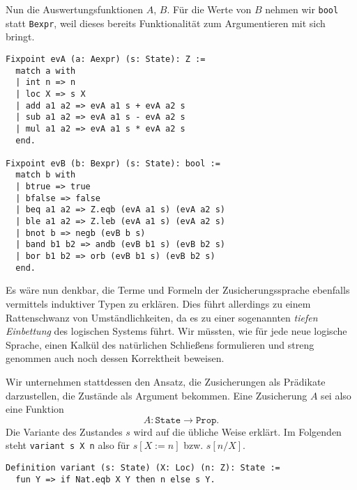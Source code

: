 \documentclass[8pt,fleqn,aspectratio=169]{beamer}
\newcommand{\parspace}{\vspace{0.8em}}
\newcommand{\code}[1]{{\texttt{#1}}}
\begin{document}
\begin{frame}[fragile]
Nun die Auswertungsfunktionen $A$, $B$. Für die Werte von $B$ nehmen wir
\code{bool} statt \code{Bexpr}, weil dieses bereits Funktionalität zum
Argumentieren mit sich bringt.

\begin{small}
\begin{lstlisting}[language=Coq, xleftmargin=\mathindent]
Fixpoint evA (a: Aexpr) (s: State): Z :=
  match a with
  | int n => n
  | loc X => s X
  | add a1 a2 => evA a1 s + evA a2 s
  | sub a1 a2 => evA a1 s - evA a2 s
  | mul a1 a2 => evA a1 s * evA a2 s
  end.

Fixpoint evB (b: Bexpr) (s: State): bool :=
  match b with
  | btrue => true
  | bfalse => false
  | beq a1 a2 => Z.eqb (evA a1 s) (evA a2 s)
  | ble a1 a2 => Z.leb (evA a1 s) (evA a2 s)
  | bnot b => negb (evB b s)
  | band b1 b2 => andb (evB b1 s) (evB b2 s)
  | bor b1 b2 => orb (evB b1 s) (evB b2 s)
  end.
\end{lstlisting}
\end{small}
\end{frame}

\begin{frame}[fragile]
Es wäre nun denkbar, die Terme und Formeln der Zusicherungssprache
ebenfalls vermittels induktiver Typen zu erklären. Dies führt allerdings
zu einem Rattenschwanz von Umständlichkeiten, da es zu einer
sogenannten \emph{tiefen Einbettung} des logischen Systems führt.
Wir müssten, wie für jede neue logische Sprache, einen Kalkül des natürlichen
Schließens formulieren und streng genommen auch noch dessen Korrektheit
beweisen.\pause

\parspace
Wir unternehmen stattdessen den Ansatz, die Zusicherungen als
Prädikate darzustellen, die Zustände als Argument bekommen. Eine
Zusicherung $A$ sei also eine Funktion
\[A\colon\texttt{State}\to\texttt{Prop}.\]\pause
Die Variante des Zustandes $s$ wird auf die übliche Weise erklärt.
Im Folgenden steht \code{variant s X n} also für $s[X:=n]$ bzw. $s[n/X]$.

\parspace
\begin{lstlisting}[language=Coq, xleftmargin=\mathindent]
Definition variant (s: State) (X: Loc) (n: Z): State :=
  fun Y => if Nat.eqb X Y then n else s Y.
\end{lstlisting}
\end{frame}
\end{document}
